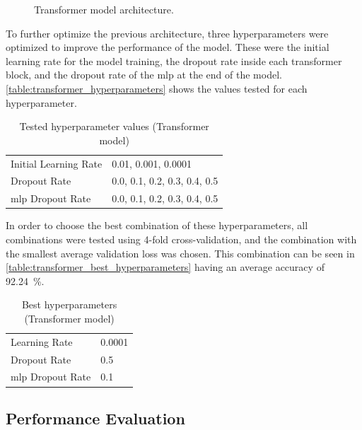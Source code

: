 \begin{figure}[ht]
    \centering
    {\fontsize{10}{12}\selectfont}
    \caption{Transformer model architecture.}
    \label{fig:transformer_architecture}
\end{figure}

To further optimize the previous architecture, three hyperparameters were optimized to improve the performance of the model. These were the initial learning rate for the model training, the dropout rate inside each transformer block, and the dropout rate of the \acs{mlp} at the end of the model. \autoref{table:transformer_hyperparameters} shows the values tested for each hyperparameter.

\begin{table}[ht]
    \centering
    \caption{Tested hyperparameter values (Transformer model)}
    \label{table:transformer_hyperparameters}
    \begin{tabular}{ll}
        \toprule
        Initial Learning Rate & 0.01, 0.001, 0.0001 \\
        Dropout Rate & 0.0, 0.1, 0.2, 0.3, 0.4, 0.5 \\
        \acs{mlp} Dropout Rate & 0.0, 0.1, 0.2, 0.3, 0.4, 0.5 \\
        \bottomrule
    \end{tabular}
\end{table}

In order to choose the best combination of these hyperparameters, all combinations were tested using 4-fold cross-validation, and the combination with the smallest average validation loss was chosen. This combination can be seen in \autoref{table:transformer_best_hyperparameters} having an average accuracy of \SI{92.24}{\percent}.

\begin{table}[ht]
    \centering
    \caption{Best hyperparameters (Transformer model)}
    \label{table:transformer_best_hyperparameters}
    \begin{tabular}{ll}
        \toprule
        Learning Rate & 0.0001 \\
        Dropout Rate & 0.5 \\
        \acs{mlp} Dropout Rate & 0.1 \\
        \bottomrule
    \end{tabular}
\end{table}

\subsection{Performance Evaluation}

